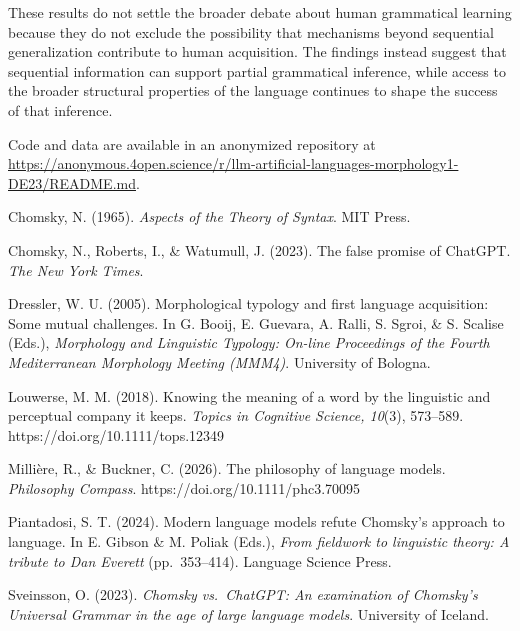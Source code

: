 \documentclass[11pt]{article}
\begin{document}
These results do not settle the broader debate about human grammatical learning because they do not exclude the possibility that mechanisms beyond sequential generalization contribute to human acquisition. The findings instead suggest that sequential information can support partial grammatical inference, while access to the broader structural properties of the language continues to shape the success of that inference.

Code and data are available in an anonymized repository at \url{https://anonymous.4open.science/r/llm-artificial-languages-morphology1-DE23/README.md}.

\begin{thebibliography}{}

Chomsky, N. (1965). \emph{Aspects of the Theory of Syntax}. MIT Press.

Chomsky, N., Roberts, I., \& Watumull, J. (2023). The false promise of ChatGPT. \emph{The New York Times}.

Dressler, W. U. (2005). Morphological typology and first language acquisition: Some mutual challenges. In G. Booij, E. Guevara, A. Ralli, S. Sgroi, \& S. Scalise (Eds.), \emph{Morphology and Linguistic Typology: On-line Proceedings of the Fourth Mediterranean Morphology Meeting (MMM4)}. University of Bologna.

Louwerse, M. M. (2018). Knowing the meaning of a word by the linguistic and perceptual company it keeps. \emph{Topics in Cognitive Science, 10}(3), 573--589. https://doi.org/10.1111/tops.12349

Millière, R., \& Buckner, C. (2026). The philosophy of language models. \emph{Philosophy Compass}. https://doi.org/10.1111/phc3.70095

Piantadosi, S. T. (2024). Modern language models refute Chomsky's approach to language. In E. Gibson \& M. Poliak (Eds.), \emph{From fieldwork to linguistic theory: A tribute to Dan Everett} (pp.~353--414). Language Science Press.

Sveinsson, O. (2023). \emph{Chomsky vs.~ChatGPT: An examination of Chomsky's Universal Grammar in the age of large language models}. University of Iceland.

\end{thebibliography}
\end{document}
